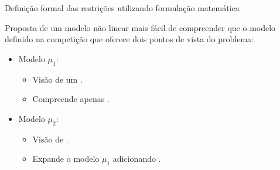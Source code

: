 \documentclass[8pt,mathserif,professionalfont]{beamer}
\begin{document}
\begin{frame}{Definição formal das restrições utilizando formulação matemática}

Proposta de um modelo não linear mais fácil de compreender que o modelo definido na competição que oferece dois pontos de vista do problema:
\medskip

	\begin{itemize}
		\item Modelo $\mu_1$: 
			\begin{itemize}
				\item Visão de um .
				\item Compreende apenas .
			\end{itemize}
		
		\smallskip
		\item Modelo $\mu_2$:
		\begin{itemize}
				\item Visão de .
				\item Expande o modelo $\mu_1$ adicionando .
			\end{itemize}
	\end{itemize}


\end{frame}
\end{document}
